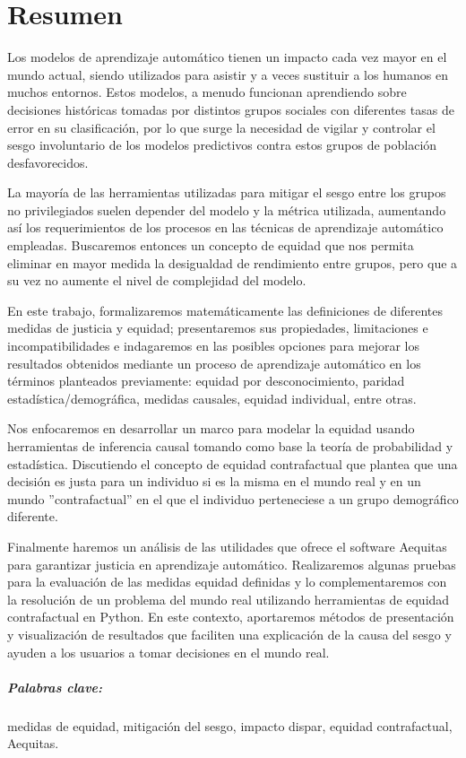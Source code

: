 \chapter*{Resumen}


Los modelos de aprendizaje automático tienen un impacto cada vez mayor en el mundo actual, siendo utilizados para asistir y a veces sustituir a los humanos en muchos entornos. Estos modelos, a menudo funcionan aprendiendo sobre decisiones históricas tomadas por distintos grupos sociales con diferentes tasas de error en su clasificación, por lo que surge la necesidad de vigilar y controlar el sesgo involuntario de los modelos predictivos contra estos
grupos de población desfavorecidos.

La mayoría de las herramientas utilizadas para mitigar el sesgo entre los grupos no privilegiados suelen depender del modelo y la métrica utilizada, aumentando así los requerimientos de los procesos en las técnicas de aprendizaje automático empleadas. Buscaremos entonces un concepto de equidad que nos permita eliminar en mayor medida la desigualdad de rendimiento entre grupos, pero que a su vez no aumente el nivel de complejidad del modelo.

En este trabajo, formalizaremos matemáticamente las definiciones de diferentes medidas de justicia y
equidad; presentaremos sus propiedades, limitaciones e incompatibilidades e indagaremos en las posibles opciones
para mejorar los resultados obtenidos mediante un proceso de aprendizaje automático en los
términos planteados previamente:
equidad por desconocimiento, paridad estadística/demográfica, medidas causales, equidad individual, entre otras.

Nos enfocaremos en desarrollar un marco para modelar la equidad usando herramientas de inferencia causal tomando como base la teoría de probabilidad y estadística. Discutiendo el concepto de equidad contrafactual que plantea que una decisión es justa para un individuo si es la misma en el mundo real y en un
mundo ''contrafactual'' en el que el individuo perteneciese a un grupo demográfico
diferente. 

Finalmente haremos un análisis de las utilidades que ofrece el software Aequitas para garantizar justicia en aprendizaje automático. Realizaremos algunas pruebas para la evaluación de las medidas equidad definidas y lo complementaremos con la resolución de un problema del mundo real utilizando herramientas de equidad contrafactual en Python. En este contexto, aportaremos métodos de presentación y visualización de resultados que faciliten una explicación de la causa del sesgo y ayuden a los usuarios a tomar decisiones en el mundo real.

\paragraph{Palabras clave:} medidas de equidad, mitigación del sesgo, impacto dispar, equidad contrafactual, Aequitas.